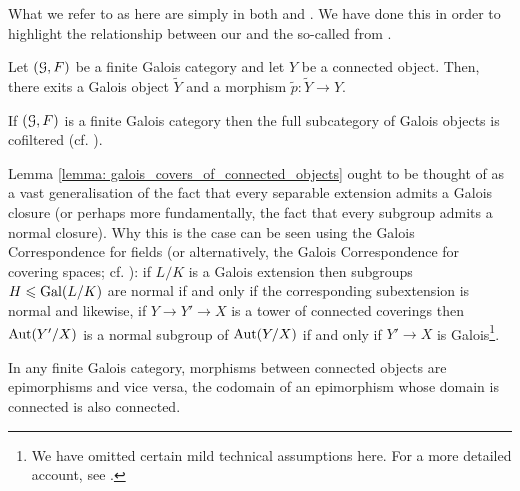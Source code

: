             \begin{remark}
                What we refer to as  here are simply  in both \cite[Expos\'e V]{SGA1} and \cite[\href{https://stacks.math.columbia.edu/tag/0BMQ}{Tag 0BMQ}]{stacks}. We have done this in order to highlight the relationship between our  and the so-called  from \cite[Section 7]{bhatt_scholze_2014_pro_etale}.
            \end{remark}
            
            \begin{lemma} \label{lemma: galois_covers_of_connected_objects}
                \cite[\href{https://stacks.math.columbia.edu/tag/0BN2}{Tag 0BN2}]{stacks} Let $(\mathcal{G}, F)$ be a finite Galois category and let $Y$ be a connected object. Then, there exits a Galois object $\tilde{Y}$ and a morphism $\tilde{p}: \tilde{Y} \to Y$.
            \end{lemma} 
            \begin{corollary} \label{coro: cofiltered_diagrams_of_Galois_objects_in_a_finite_Galois_category}
                If $(\mathcal{G}, F)$ is a finite Galois category then the full subcategory of Galois objects is cofiltered (cf. \cite[\href{https://stacks.math.columbia.edu/tag/00D3}{Tag 00D3}]{stacks}).
            \end{corollary}
            \begin{remark}
                Lemma \ref{lemma: galois_covers_of_connected_objects} ought to be thought of as a vast generalisation of the fact that every separable extension admits a Galois closure (or perhaps more fundamentally, the fact that every subgroup admits a normal closure). Why this is the case can be seen using the Galois Correspondence for fields (or alternatively, the Galois Correspondence for covering spaces; cf. \cite[Theorem 1.38]{hatcher2002algebraic}): if $L/K$ is a Galois extension then subgroups $H \leqslant \mathrm{Gal}(L/K)$ are normal if and only if the corresponding subextension is normal and likewise, if $Y \to Y' \to X$ is a tower of connected coverings then $\mathrm{Aut}(Y'/X)$ is a normal subgroup of $\mathrm{Aut}(Y/X)$ if and only if $Y' \to X$ is Galois\footnote{We have omitted certain mild technical assumptions here. For a more detailed account, see \cite[Section 1.3]{hatcher2002algebraic}.}. 
            \end{remark}
            \begin{lemma} \label{lemma: morphisms_between_connected_objects_are_epic}
                In any finite Galois category, morphisms between connected objects are epimorphisms and vice versa, the codomain of an epimorphism whose domain is connected is also connected.
            \end{lemma}

